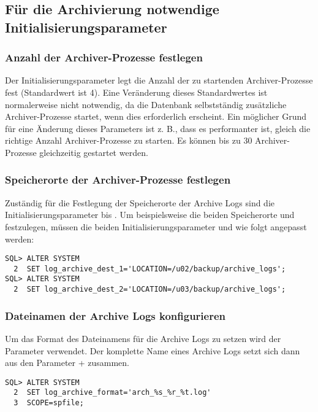       \subsection{Für die Archivierung notwendige Initialisierungsparameter}
        \subsubsection{Anzahl der Archiver-Prozesse festlegen}
          Der Initialisierungsparameter  legt die Anzahl der zu startenden Archiver-Prozesse fest (Standardwert ist 4). Eine Veränderung dieses Standardwertes ist normalerweise nicht notwendig, da die Datenbank selbstständig zusätzliche Archiver-Prozesse startet, wenn dies erforderlich erscheint.
					Ein möglicher Grund für eine Änderung dieses Parameters ist z. B., dass es  performanter ist, gleich die richtige Anzahl Archiver-Prozesse zu starten. Es können bis zu 30 Archiver-Prozesse gleichzeitig gestartet werden.

        \subsubsection{Speicherorte der Archiver-Prozesse festlegen}
         Zuständig für die Festlegung der Speicherorte der Archive Logs sind die Initialisierungsparameter \newline{} bis . Um beispielsweise die beiden Speicherorte  und  festzulegen, müssen die beiden Initialisierungsparameter  und  wie folgt angepasst werden:
          \begin{lstlisting}[caption={log\_archive\_dest-Parameter setzen},label=admin48,language=oracle_sql]
SQL> ALTER SYSTEM
  2  SET log_archive_dest_1='LOCATION=/u02/backup/archive_logs';
SQL> ALTER SYSTEM
  2  SET log_archive_dest_2='LOCATION=/u03/backup/archive_logs';
          \end{lstlisting}
        \subsubsection{Dateinamen der Archive Logs konfigurieren}
          Um das Format des Dateinamens für die Archive Logs zu setzen wird der Parameter \newline{} verwendet. Der komplette Name eines Archive Logs setzt sich dann aus den Parameter  +  zusammen.
          \begin{lstlisting}[caption={\parameter{log\_archive\_format}-Parameter
          setzen},label=admin49,language=oracle_sql,alsolanguage=sqlplus]
SQL> ALTER SYSTEM
  2  SET log_archive_format='arch_%s_%r_%t.log'
  3  SCOPE=spfile;
          \end{lstlisting}
    
